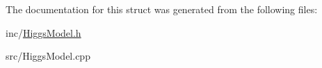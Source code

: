 The documentation for this struct was generated from the following files\-:\begin{DoxyCompactItemize}
\item 
inc/\hyperlink{HiggsModel_8h}{Higgs\-Model.\-h}\item 
src/Higgs\-Model.\-cpp\end{DoxyCompactItemize}
